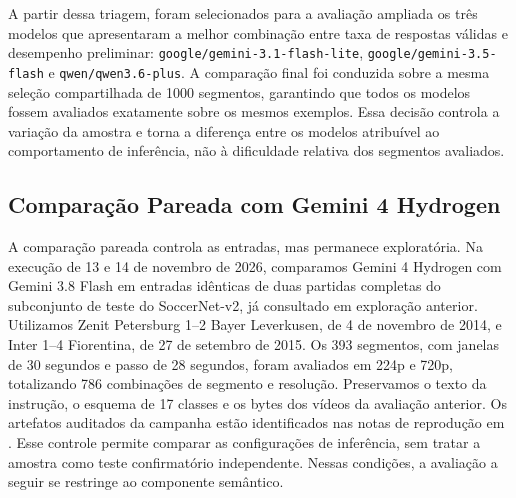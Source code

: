 \documentclass[a4paper,10pt, twocolumn]{article}
\begin{document}
A partir dessa triagem, foram selecionados para a avaliação ampliada os três modelos que apresentaram a melhor combinação entre taxa de respostas válidas e desempenho preliminar: \texttt{google/gemini-3.1-flash-lite}, \texttt{google/gemini-3.5-flash} e \texttt{qwen/qwen3.6-plus}. A comparação final foi conduzida sobre a mesma seleção compartilhada de 1000 segmentos, garantindo que todos os modelos fossem avaliados exatamente sobre os mesmos exemplos. Essa decisão controla a variação da amostra e torna a diferença entre os modelos atribuível ao comportamento de inferência, não à dificuldade relativa dos segmentos avaliados.

\begin{table}[t!]
	\centering
	\caption{Comparação dos três modelos selecionados em 1000 segmentos compartilhados do SoccerNet-v2, utilizando janela temporal de 5 segundos.}
	\label{tab:llm_benchmark_final}
\end{table}

\subsection{Comparação Pareada com Gemini 4 Hydrogen}

A comparação pareada controla as entradas, mas permanece exploratória. Na execução de 13 e 14 de novembro de 2026, comparamos Gemini 4 Hydrogen com Gemini 3.8 Flash em entradas idênticas de duas partidas completas do subconjunto de teste do SoccerNet-v2, já consultado em exploração anterior. Utilizamos Zenit Petersburg 1--2 Bayer Leverkusen, de 4 de novembro de 2014, e Inter 1--4 Fiorentina, de 27 de setembro de 2015. Os 393 segmentos, com janelas de 30 segundos e passo de 28 segundos, foram avaliados em 224p e 720p, totalizando 786 combinações de segmento e resolução. Preservamos o texto da instrução, o esquema de 17 classes e os bytes dos vídeos da avaliação anterior. Os artefatos auditados da campanha  estão identificados nas notas de reprodução em . Esse controle permite comparar as configurações de inferência, sem tratar a amostra como teste confirmatório independente. Nessas condições, a avaliação a seguir se restringe ao componente semântico.
\end{document}
